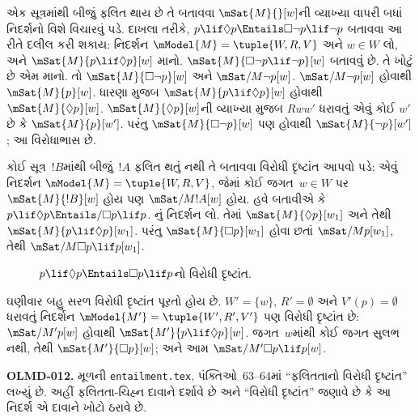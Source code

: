 \begin{ex}
  એક સૂત્રમાંથી બીજું ફલિત થાય છે તે બતાવવા
  $\mSat{M}{}[w]$ની વ્યાખ્યા વાપરી બધાં નિદર્શનો
  વિશે વિચારવું પડે. દાખલા તરીકે,
  $p \lif \Diamond p \Entails \Box\lnot p \lif \lnot p$
  બતાવવા આ રીતે દલીલ કરી શકાય: નિદર્શન
  $\mModel{M} = \tuple{W, R,
    V}$ અને $w \in W$ લો, અને $\mSat{M}{p \lif \Diamond
    p}[w]$ માનો. $\mSat{M}{\Box\lnot p \lif \lnot
    p}[w]$ બતાવવું છે. તે ખોટું છે એમ માનો. તો
  $\mSat{M}{\Box\lnot p}[w]$ અને
  $\mSat/{M}{\lnot p}[w]$. $\mSat/{M}{\lnot p}[w]$
  હોવાથી $\mSat{M}{p}[w]$. ધારણા મુજબ
  $\mSat{M}{p \lif \Diamond p}[w]$ હોવાથી
  $\mSat{M}{\Diamond p}[w]$. $\mSat{M}{\Diamond
    p}[w]$ની વ્યાખ્યા મુજબ $Rww'$ ધરાવતું એવું કોઈ
  $w'$ છે કે $\mSat{M}{p}[w']$. પરંતુ
  $\mSat{M}{\Box \lnot p}[w]$ પણ હોવાથી
  $\mSat{M}{\lnot p}[w']$; આ વિરોધાભાસ છે.

  કોઈ સૂત્ર~$!B$માંથી બીજું~$!A$ ફલિત થતું
  નથી તે બતાવવા વિરોધી દૃષ્ટાંત આપવો પડે: એવું
  નિદર્શન $\mModel{M} = \tuple{W, R,
    V}$, જેમાં કોઈ જગત~$w \in W$ પર $\mSat{M}{!B}[w]$
  હોય પણ $\mSat/{M}{!A}[w]$ હોય. હવે બતાવીએ કે
  $p \lif \Diamond p \Entails/
  \Box p \lif p$. નું નિદર્શન લો.
  તેમાં $\mSat{M}{\Diamond p}[w_1]$ અને તેથી
  $\mSat{M}{p \lif
    \Diamond p}[w_1]$. પરંતુ $\mSat{M}{\Box p}[w_1]$
  હોવા છતાં $\mSat/{M}{p}[w_1]$, તેથી
  $\mSat/{M}{\Box p \lif p}[w_1]$.
  \begin{figure}
  \begin{center}
  \end{center}
  \caption{$p \lif \Diamond p \Entails \Box p \lif p$નો વિરોધી દૃષ્ટાંત.}
  \end{figure}

  ઘણીવાર બહુ સરળ વિરોધી દૃષ્ટાંત પૂરતો હોય છે.
  $W' = \{w\}$, $R' = \emptyset$ અને $V'(p) =
  \emptyset$ ધરાવતું નિદર્શન $\mModel{M'} =
  \tuple{W', R', V'}$ પણ વિરોધી દૃષ્ટાંત છે:
  $\mSat/{M'}{p}[w]$ હોવાથી
  $\mSat{M'}{p \lif \Diamond p}[w]$. જગત~$w$માંથી
  કોઈ જગત સુલભ નથી, તેથી $\mSat{M'}{\Box p}[w]$;
  અને આમ $\mSat/{M'}{\Box p
    \lif p}[w]$.
\end{ex}
\begin{editorial}
\textbf{OLMD-012.} મૂળની \texttt{entailment.tex}, પંક્તિઓ~63--64માં “ફલિતતાનો વિરોધી દૃષ્ટાંત” લખ્યું છે. અહીં ફલિતતા-ચિહ્ન દાવાને દર્શાવે છે અને “વિરોધી દૃષ્ટાંત” જણાવે છે કે આ નિદર્શ એ દાવાને ખોટો ઠરાવે છે.
\end{editorial}

